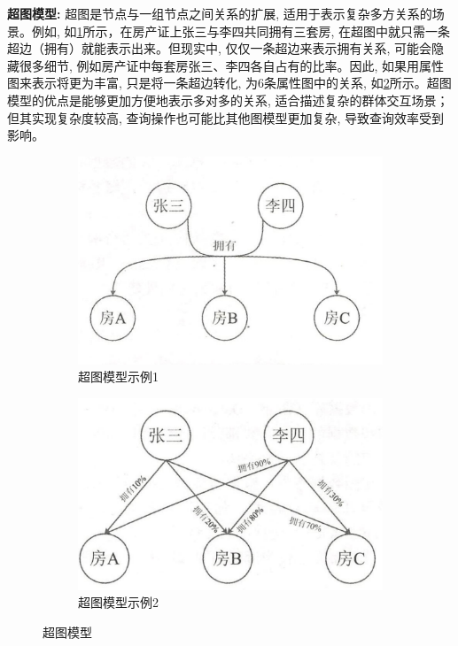 \textbf{超图模型:} 超图是节点与一组节点之间关系的扩展, 适用于表示复杂多方关系的场景。例如, 如\cref{fig:hypergraph1}所示，在房产证上张三与李四共同拥有三套房, 在超图中就只需一条超边（拥有）就能表示出来。但现实中, 仅仅一条超边来表示拥有关系, 可能会隐藏很多细节, 例如房产证中每套房张三、李四各自占有的比率。因此, 如果用属性图来表示将更为丰富, 只是将一条超边转化, 为6条属性图中的关系, 如\cref{fig:hypergraph2}所示。超图模型的优点是能够更加方便地表示多对多的关系, 适合描述复杂的群体交互场景；但其实现复杂度较高, 查询操作也可能比其他图模型更加复杂, 导致查询效率受到影响。
\begin{figure}[H]
	\centering
	\begin{subfigure}[b]{0.45\textwidth}
		\centering
		\includegraphics[width=1\textwidth]{images/16.png}
		\caption{超图模型示例1}
		\label{fig:hypergraph1}
	\end{subfigure}
	\begin{subfigure}[b]{0.45\textwidth}
		\centering
		\includegraphics[width=1\textwidth]{images/17.png}
		\caption{超图模型示例2}
		\label{fig:hypergraph2}
	\end{subfigure}
	\caption{超图模型}
	\label{fig:hypergraph}
\end{figure}




